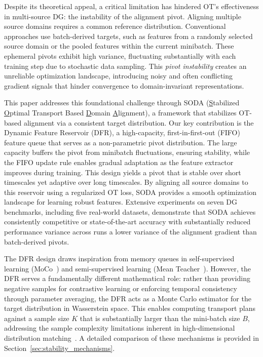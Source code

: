 \documentclass[preprint,12pt]{elsarticle}
\providecommand{\DIFadd}[1]{{\protect\color{blue} \sf #1}} %
\providecommand{\DIFdel}[1]{{\protect\color{red} \scriptsize #1}} %
\providecommand{\DIFaddbegin}{} %
\providecommand{\DIFaddend}{} %
\providecommand{\DIFdelbegin}{} %
\providecommand{\DIFdelend}{} %
\newcommand{\DIFscaledelfig}{0.5}
\newlength{\DIFdelgraphicswidth} %
\newlength{\DIFdelgraphicsheight} %
\newcommand{\DIFaddincludegraphics}[2][]{{\color{blue}\fbox{\DIFOincludegraphics[#1]{#2}}}} %
\newcommand{\DIFdelincludegraphics}[2][]{%
\sbox{\DIFdelgraphicsbox}{\DIFOincludegraphics[#1]{#2}}%
\settoboxwidth{\DIFdelgraphicswidth}{\DIFdelgraphicsbox} %
\settoboxtotalheight{\DIFdelgraphicsheight}{\DIFdelgraphicsbox} %
\scalebox{\DIFscaledelfig}{%
\parbox[b]{\DIFdelgraphicswidth}{\usebox{\DIFdelgraphicsbox}\\[-\baselineskip] \rule{\DIFdelgraphicswidth}{0em}}\llap{\resizebox{\DIFdelgraphicswidth}{\DIFdelgraphicsheight}{%
\setlength{\unitlength}{\DIFdelgraphicswidth}%
\begin{picture}(1,1)%
\thicklines\linethickness{2pt} %
{\color[rgb]{1,0,0}\put(0,0){\framebox(1,1){}}}%
{\color[rgb]{1,0,0}\put(0,0){\line( 1,1){1}}}%
{\color[rgb]{1,0,0}\put(0,1){\line(1,-1){1}}}%
\end{picture}%
}\hspace*{3pt}}} %
} %
\DeclareRobustCommand{\DIFaddbegin}{\DIFOaddbegin \let\includegraphics\DIFaddincludegraphics} %
\DeclareRobustCommand{\DIFaddend}{\DIFOaddend \let\includegraphics\DIFOincludegraphics} %
\DeclareRobustCommand{\DIFdelbegin}{\DIFOdelbegin \let\includegraphics\DIFdelincludegraphics} %
\DeclareRobustCommand{\DIFdelend}{\DIFOaddend \let\includegraphics\DIFOincludegraphics} %
\begin{document}
Despite its theoretical appeal, a critical limitation has hindered OT's effectiveness in multi-source DG: the instability of the alignment pivot. Aligning multiple source domains requires a common reference distribution. Conventional approaches use batch-derived targets, such as features from a randomly selected source domain or the pooled features within the current minibatch. These ephemeral pivots exhibit high variance, fluctuating substantially with each training step due to stochastic data sampling. This \textit{pivot instability} creates an unreliable optimization landscape, introducing noisy and often conflicting gradient signals that hinder convergence to domain-invariant representations.

\begin{sloppypar} 
This paper addresses this foundational challenge through SODA (\underline{S}tabilized \underline{O}ptimal Transport Based \underline{D}omain \underline{A}lignment), a framework that stabilizes OT-based alignment via a consistent target distribution. Our key contribution is the Dynamic Feature Reservoir (DFR), a high-capacity, first-in-first-out (FIFO) feature queue that serves as a non-parametric pivot distribution. The large capacity buffers the pivot from minibatch fluctuations, ensuring stability, while the FIFO update rule enables gradual adaptation as the feature extractor improves during training. This design yields a pivot that is stable over short timescales yet adaptive over long timescales. By aligning all source domains to this reservoir using a regularized OT loss, SODA provides a smooth optimization landscape for learning robust features. Extensive experiments on seven DG benchmarks, including five real-world datasets, demonstrate that SODA achieves consistently competitive or state-of-the-art accuracy with \DIFdelbegin \DIFdel{substantially reduced performance variance across runs}\DIFdelend \DIFaddbegin \DIFadd{a lower variance of the alignment gradient than batch-derived pivots}\DIFaddend .
\end{sloppypar} 

The DFR design draws inspiration from memory queues in self-supervised learning (MoCo~\citep{he2020momentum}) and semi-supervised learning (Mean Teacher~\citep{tarvainen2017mean}). However, the DFR serves a fundamentally different mathematical role: rather than providing negative samples for contrastive learning or enforcing temporal consistency through parameter averaging, the DFR acts as a Monte Carlo estimator for the target distribution in Wasserstein space. This enables computing transport plans against a sample size $K$ that is substantially larger than the mini-batch size $B$, addressing the sample complexity limitations inherent in high-dimensional distribution matching~\citep{dong2020how}. A detailed comparison of these mechanisms is provided in Section~\ref{sec:stability_mechanisms}.
\end{document}
